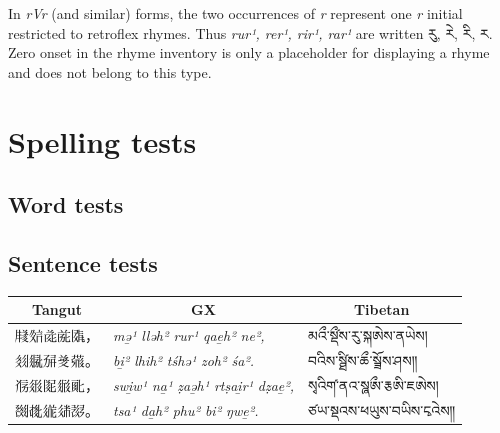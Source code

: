 \documentclass[12pt]{nextart}
\begin{document}
In \emph{rVr} (and similar) forms, the two occurrences of \emph{r} represent one \emph{r} initial restricted to retroflex rhymes. Thus \emph{rur¹, rer¹, rir¹, rar¹} are written རུ, རེ, རི, ར. Zero onset in the rhyme inventory is only a placeholder for displaying a rhyme and does not belong to this type.

\section{Spelling tests}
\subsection{Word tests}
\begin{center}
\small
\renewcommand{\arraystretch}{1.15}
\setlength{\tabcolsep}{6pt}
\end{center}

\subsection{Sentence tests}

\begin{center}
\small
\renewcommand{\arraystretch}{1.20}
\setlength{\tabcolsep}{6pt}
\begin{tabular}{lll}
\toprule
\multicolumn{1}{c}{\textbf{Tangut}} &
\multicolumn{1}{c}{\textbf{GX}} &
\multicolumn{1}{c}{\textbf{Tibetan}} \\
\midrule
𗹦𗼻𗯨𗐯𗂥， &
\emph{mə̱¹ lləh² rur¹ qae̱h² ne²,} &
མའྀ་སྡྀ༹ས་རུ་སྐཨེས་ནཡེས། \\

𗾔𗼑𗉘𘝨𗜓。 &
\emph{bi̱² lhih² tśhə¹ zoh² śa².} &
བའིས་སྠི༹ས་ཆྀ་སྯོས་ཤས༎ \\

𗭼𗤼𗂈𗼛𘚢， &
\emph{swi̱w¹ na̱¹ ẓaə̱h¹ rtṣai̱r¹ dẓae̱²,} &
སྭའིག༹་ནའ་སྮཨྀ་རྕཨི་ཇཨེས། \\

𗉅𗎒𗨁𗤢𗖠。 &
\emph{tsa¹ da̱h² phu² bi² ŋwe̱².} &
ཙཡ་སྡའས་ཕཡུས་བཡིས་ངྭའེས༎ \\
\bottomrule
\end{tabular}
\end{center}
\end{document}
